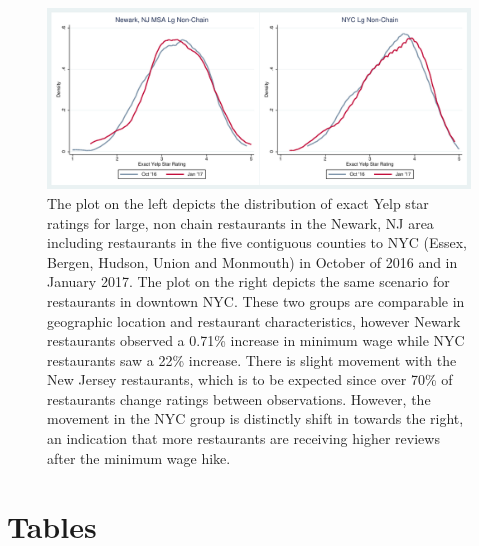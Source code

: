\documentclass[11pt]{article}
\begin{document}
\begin{figure}
\centering
\includegraphics[scale=.75]{star_dens_ny.pdf}
\caption[Short Header]{
The plot on the left depicts the distribution of exact Yelp star ratings for large, non chain restaurants in the Newark, NJ area including restaurants in the five contiguous counties to NYC (Essex, Bergen, Hudson, Union and Monmouth) in October of 2016 and in January 2017. The plot on the right depicts the same scenario for restaurants in downtown NYC. These two groups are comparable in geographic location and restaurant characteristics, however Newark restaurants observed a 0.71\% increase in minimum wage while NYC restaurants saw a 22\% increase. There is slight movement with the New Jersey restaurants, which is to be expected since over 70\% of restaurants change ratings between observations. However, the movement in the NYC group is distinctly shift in towards the right, an indication that more restaurants are receiving higher reviews after the minimum wage hike. 
}
\end{figure}

\vspace{100mm}

\clearpage

\newpage 

\section{Tables}
\end{document}
